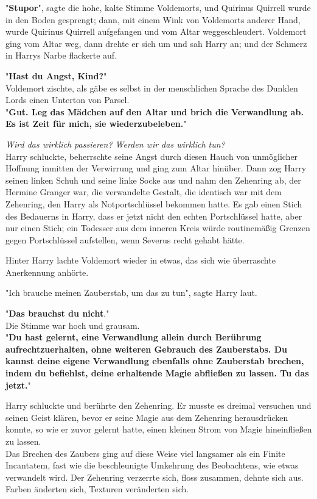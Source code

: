 {"\textbf{Stupor}", sagte die hohe, kalte Stimme Voldemorts, und Quirinus Quirrell wurde in den Boden gesprengt; dann, mit einem Wink von Voldemorts anderer Hand, wurde Quirinus Quirrell aufgefangen und vom Altar weggeschleudert. Voldemort ging vom Altar weg, dann drehte er sich um und sah Harry an; und der Schmerz in Harrys Narbe flackerte auf.

"\textbf{Hast du Angst, Kind?}"\\ Voldemort zischte, als gäbe es selbst in der menschlichen Sprache des Dunklen Lords einen Unterton von Parsel.\\ "\textbf{Gut. Leg das Mädchen auf den Altar und brich die Verwandlung ab. Es ist Zeit für mich, sie wiederzubeleben.}"

\emph{Wird das wirklich passieren? Werden wir das wirklich tun?}\\ Harry schluckte, beherrschte seine Angst durch diesen Hauch von unmöglicher Hoffnung inmitten der Verwirrung und ging zum Altar hinüber. Dann zog Harry seinen linken Schuh und seine linke Socke aus und nahm den Zehenring ab, der Hermine Granger war, die verwandelte Gestalt, die identisch war mit dem Zehenring, den Harry als Notportschlüssel bekommen hatte. Es gab einen Stich des Bedauerns in Harry, dass er jetzt nicht den echten Portschlüssel hatte, aber nur einen Stich; ein Todesser aus dem inneren Kreis würde routinemäßig Grenzen gegen Portschlüssel aufstellen, wenn Severus recht gehabt hätte.

Hinter Harry lachte Voldemort wieder in etwas, das sich wie überraschte Anerkennung anhörte.

"Ich brauche meinen Zauberstab, um das zu tun", sagte Harry laut.

"\textbf{Das brauchst du nicht}."\\ Die Stimme war hoch und grausam.\\ "\textbf{Du hast gelernt, eine Verwandlung allein durch Berührung aufrechtzuerhalten, ohne weiteren Gebrauch des Zauberstabs. Du kannst deine eigene Verwandlung ebenfalls ohne Zauberstab brechen, indem du befiehlst, deine erhaltende Magie abfließen zu lassen. Tu das jetzt.}"

Harry schluckte und berührte den Zehenring. Er musste es dreimal versuchen und seinen Geist klären, bevor er seine Magie aus dem Zehenring herausdrücken konnte, so wie er zuvor gelernt hatte, einen kleinen Strom von Magie hineinfließen zu lassen.\\ Das Brechen des Zaubers ging auf diese Weise viel langsamer als ein Finite Incantatem, fast wie die beschleunigte Umkehrung des Beobachtens, wie etwas verwandelt wird. Der Zehenring verzerrte sich, floss zusammen, dehnte sich aus. Farben änderten sich, Texturen veränderten sich.

}
